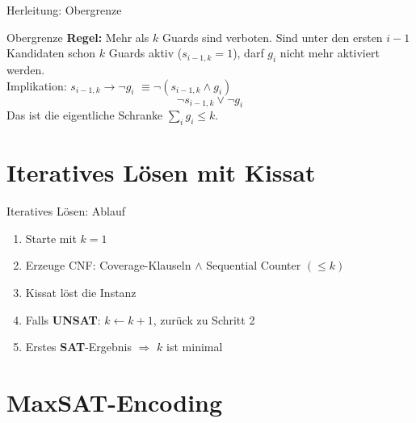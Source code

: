 \documentclass[11pt,aspectratio=169]{beamer}
\newcommand{\guard}[1]{g_{#1}}
\newcommand{\svar}[2]{s_{#1,#2}}
\begin{document}
\begin{frame}{Herleitung: Obergrenze}
  \begin{block}{Obergrenze}
    \textbf{Regel:} Mehr als $k$ Guards sind verboten. Sind unter den ersten
    $i{-}1$ Kandidaten schon $k$ Guards aktiv ($\svar{i-1}{k}=1$), darf $\guard{i}$
    nicht mehr aktiviert werden.\\[0.2em]
    Implikation: $\svar{i-1}{k} \rightarrow \neg\guard{i}$
    \quad$\equiv$\quad $\neg(\svar{i-1}{k} \wedge \guard{i})$
    \[
      \neg\svar{i-1}{k} \vee \neg\guard{i}
    \]
    Das ist die eigentliche Schranke $\sum_i \guard{i} \leq k$.
  \end{block}
\end{frame}

\section{Iteratives Lösen mit Kissat}

\begin{frame}{Iteratives Lösen: Ablauf}
  \begin{enumerate}
    \item Starte mit $k=1$
    \item Erzeuge CNF: Coverage-Klauseln $\wedge$ Sequential Counter $(\leq k)$
    \item Kissat löst die Instanz
    \item Falls \textbf{UNSAT}: $k \leftarrow k+1$, zurück zu Schritt 2
    \item Erstes \textbf{SAT}-Ergebnis $\Rightarrow$ $k$ ist minimal
  \end{enumerate}
  \vspace{0.6em}

\end{frame}

 

\section{MaxSAT-Encoding}
\end{document}
